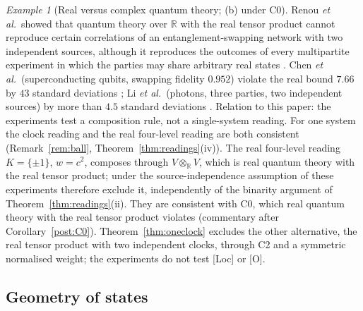 \documentclass[aps,pra,onecolumn,superscriptaddress,nofootinbib,10pt]{revtex4-2}
\theoremstyle{definition}
\theoremstyle{remark}
\newtheorem{example}[theorem]{Example}
\begin{document}
\begin{example}[Real versus complex quantum theory; (b) under C0]\label{ex:real}
Renou \emph{et al.}\ showed that quantum theory over $\mathbb R$ with the real tensor product cannot reproduce
certain correlations of an entanglement-swapping network with two independent sources, although it
reproduces the outcomes of every multipartite experiment in which the parties may share arbitrary real
states \cite{Renou}.  Chen \emph{et al.}\ (superconducting qubits, swapping fidelity $0.952$) violate the real
bound $7.66$ by $43$ standard deviations \cite{ex-Chen22}; Li \emph{et al.}\ (photons, three parties, two
independent sources) by more than $4.5$ standard deviations \cite{ex-Li22}.  Relation to this paper: the
experiments test a composition rule, not a single-system reading.  For one system the clock reading
and the real four-level reading are both consistent (Remark~\ref{rem:ball}, Theorem~\ref{thm:readings}(iv)).
The real four-level reading $K=\{\pm1\}$, $w=c^2$, composes through $V\otimes_{\mathbb R}V$, which is real quantum
theory with the real tensor product; under the source-independence assumption of \cite{Renou} these
experiments therefore exclude it, independently of the binarity argument of
Theorem~\ref{thm:readings}(ii).  They are consistent with C0, which real quantum theory with the
real tensor product violates (commentary after Corollary~\ref{post:C0}).  Theorem~\ref{thm:oneclock} excludes
the other alternative, the real tensor product with two independent clocks, through C2 and a symmetric normalised weight; the
experiments do not test [Loc] or [O].
\end{example}

\subsection{Geometry of states}
\end{document}

